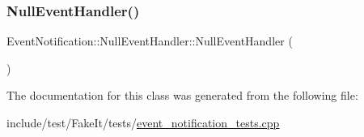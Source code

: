 \subsubsection{\texorpdfstring{NullEventHandler()}{NullEventHandler()}}
{\footnotesize\ttfamily Event\+Notification\+::\+Null\+Event\+Handler\+::\+Null\+Event\+Handler (\begin{DoxyParamCaption}{ }\end{DoxyParamCaption})\hspace{0.3cm}{\ttfamily [default]}}



The documentation for this class was generated from the following file\+:\begin{DoxyCompactItemize}
\item 
include/test/\+Fake\+It/tests/\mbox{\hyperlink{event__notification__tests_8cpp}{event\+\_\+notification\+\_\+tests.\+cpp}}\end{DoxyCompactItemize}
